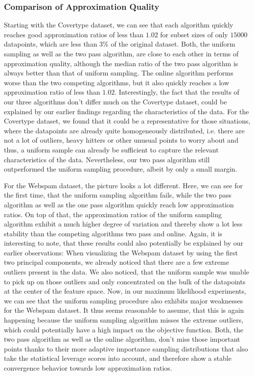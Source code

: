 \subsubsection{Comparison of Approximation Quality}

Starting with the Covertype dataset, we can see that each algorithm
quickly reaches good approximation ratios of less than $1.02$
for subset sizes of only $15000$ datapoints, which are less than
$3\%$ of the original dataset.
Both, the uniform sampling as well as the two pass algorithm, are
close to each other in terms of approximation quality, although
the median ratio of the two pass algorithm is always better than
that of uniform sampling. The online algorithm performs worse than
the two competing algorithms, but it also quickly reaches a low
approximation ratio of less than $1.02$.
Interestingly, the fact that the results of our three algorithms
don't differ much on the Covertype dataset, could
be explained by our earlier
findings regarding the characteristics of the data.
For the Covertype dataset, we found that it could be a representative for
those situations, where the datapoints are already
quite homogeneously distributed, i.e. there
are not a lot of outliers, heavy hitters or other unusual points to worry
about and thus, a uniform sample can already be sufficient to
capture the relevant characteristics of the data.
Nevertheless, our two pass algorithm still outperformed the uniform
sampling procedure, albeit by only a small margin.

For the Webspam dataset, the picture looks a lot different. Here,
we can see for the first time, that the uniform sampling algorithm
fails, while the two pass algorithm as well as the one pass
algorithm quickly reach low approximation ratios. On top of that,
the approximation ratios of the uniform sampling algorithm
exhibit a much higher degree of variation and thereby show a lot
less stability than the competing algorithms two pass and online.
Again, it is interesting to note, that these results could also
potentially be explained by our earlier observations:
When visualizing the Webspam dataset by using the first two
principal components, we already noticed that there are a few
extreme outliers present in the data. We also noticed, that
the uniform sample was unable to pick up on those outliers
and only concentrated on the bulk of the datapoints at
the center of the feature space. Now, in our
maximum likelihood experiments,
we can see that the uniform sampling procedure also
exhibits major weaknesses
for the Webspam dataset. It thus seems reasonable to assume,
that this is again happening because the uniform sampling
algorithm misses the extreme outliers, which could potentially have a
high impact on the objective function.
Both, the two pass algorithm as well as the online algorithm,
don't miss those important points thanks to their more
adaptive importance sampling distributions that also take
the statistical leverage scores into account, and therefore show a
stable convergence behavior towards low approximation ratios.

